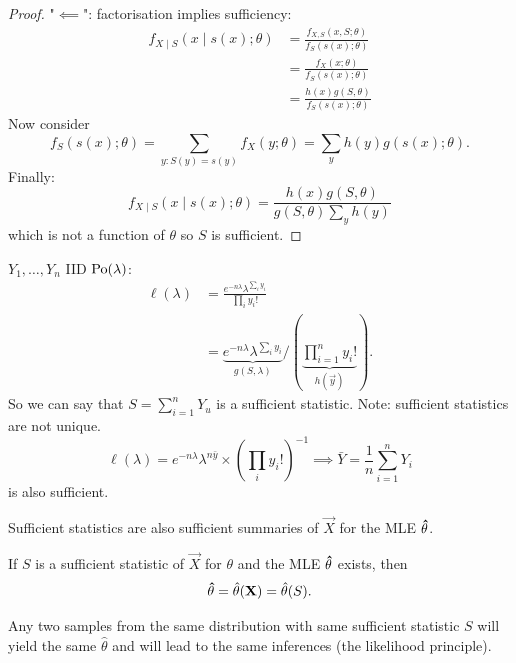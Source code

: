 \documentclass[10pt, a4paper]{article}
\begin{document}
\begin{lemma}
\begin{proof}
        "$\impliedby$":
        factorisation implies sufficiency:
        \begin{align*}
            f_{X \mid S}(x \mid s(x); \theta) &= \frac{f_{X, S}(x, S; \theta)}{f_{S}(s(x); \theta)} \\
            &= \frac{f_{X}(x; \theta)}{f_{S}(s(x); \theta)} \\
            &= \frac{h(x)g(S, \theta)}{f_{S}(s(x); \theta)}
        \end{align*}
        Now consider
        \[
        f_{S}(s(x); \theta) = \sum_{y : S(y) = s(y)} f_{X}(y; \theta) = \sum_{y}h(y)g(s(x); \theta).
        \]
        Finally:
        \[
        f_{X \mid S}(x \mid s(x); \theta) = \frac{h(x)g(S, \theta)}{g(S, \theta)\sum_{y}h(y)}
        \]
        which is not a function of $\theta$ so $S$ is sufficient.
    \end{proof}
\end{lemma}

\begin{example}
    $Y_1, \dotsc, Y_n$ IID $\operatorname{Po}(\lambda)$:
    \begin{align*}
        \ell(\lambda) &= \frac{e ^ {-n\lambda}\lambda ^ {\sum_{i}y_i}}{\prod_{i}y_i!} \\
        &= \underbrace{e ^ {-n\lambda}\lambda ^ {\sum_{i}y_i}}_{g(S, \lambda)} / \left(\underbrace{\prod_{i = 1}^{n}y_i!}_{h(\vec{y})}\right).
    \end{align*}
    So we can say that $S = \sum_{i = 1}^{n}Y_u$ is a sufficient statistic.
    Note:
    sufficient statistics are not unique.
    \[
    \ell(\lambda) = e ^ {-n\lambda}\lambda ^ {n\bar{y}} \times \left(\prod_{i}y_i!\right) ^ {-1} \implies \bar{Y} = \frac{1}{n}\sum_{i = 1}^{n}Y_i
    \]
    is also sufficient.
\end{example}

Sufficient statistics are also sufficient summaries of $\vec{X}$ for the MLE $\mathbf{\hat{\theta}}$.

\begin{proposition}
    If $S$ is a sufficient statistic of $\vec{X}$ for $\theta$ and the MLE $\mathbf{\hat{\theta}}$ exists,
    then
    \[
    \mathbf{\hat{\theta}} = \hat{\theta}(\mathbf{X}) = \hat{\theta}(S).
    \]
\end{proposition}

Any two samples from the same distribution with same sufficient statistic $S$ will yield the same $\hat{\theta}$ and will lead to the same inferences
(the likelihood principle).

\newpage
\end{document}
